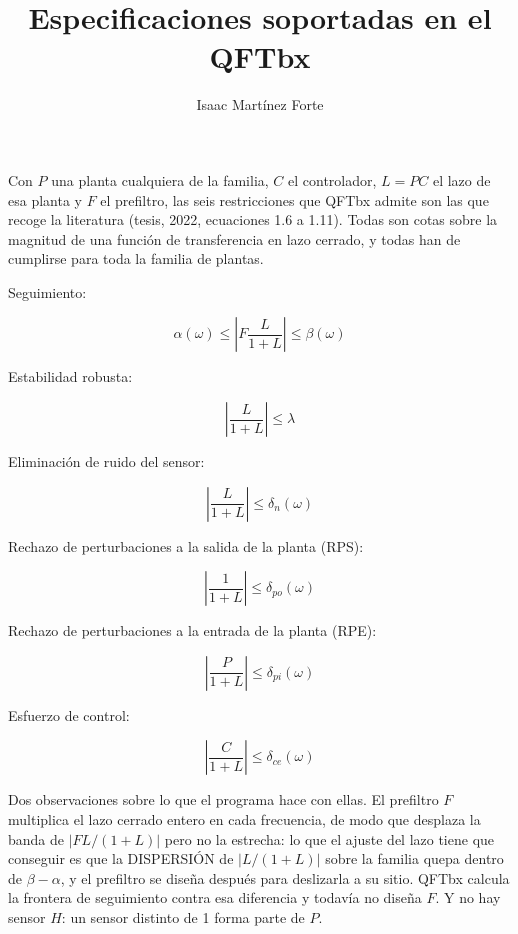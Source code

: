 \documentclass[a4paper,10pt]{article}
\title{Especificaciones soportadas en el QFTbx}
\author{Isaac Martínez Forte}
\begin{document}
\maketitle

Con $P$ una planta cualquiera de la familia, $C$ el controlador,
$L = PC$ el lazo de esa planta y $F$ el prefiltro, las seis restricciones
que QFTbx admite son las que recoge la literatura (tesis, 2022,
ecuaciones 1.6 a 1.11). Todas son cotas sobre la magnitud de una función de
transferencia en lazo cerrado, y todas han de cumplirse para toda la familia
de plantas.

Seguimiento:

$$\alpha(\omega) \leq \left| F\frac{L}{1+L} \right| \leq \beta(\omega)$$

Estabilidad robusta:

$$\left| \frac{L}{1+L} \right| \leq \lambda$$

Eliminación de ruido del sensor:

$$\left| \frac{L}{1+L} \right| \leq \delta_n(\omega)$$

Rechazo de perturbaciones a la salida de la planta (RPS):

$$\left| \frac{1}{1+L} \right| \leq \delta_{po}(\omega)$$

Rechazo de perturbaciones a la entrada de la planta (RPE):

$$\left| \frac{P}{1+L} \right| \leq \delta_{pi}(\omega)$$

Esfuerzo de control:

$$\left| \frac{C}{1+L} \right| \leq \delta_{ce}(\omega)$$

\bigskip

Dos observaciones sobre lo que el programa hace con ellas. El prefiltro $F$
multiplica el lazo cerrado entero en cada frecuencia, de modo que desplaza la
banda de $|FL/(1+L)|$ pero no la estrecha: lo que el ajuste del lazo tiene que
conseguir es que la DISPERSIÓN de $|L/(1+L)|$ sobre la familia quepa dentro de
$\beta - \alpha$, y el prefiltro se diseña después para deslizarla a su sitio.
QFTbx calcula la frontera de seguimiento contra esa diferencia y todavía no
diseña $F$. Y no hay sensor $H$: un sensor distinto de 1 forma parte de $P$.
\end{document}
